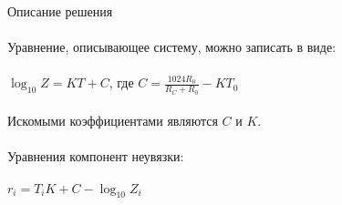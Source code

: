 \documentclass{article}
\begin{document}
    Описание решения\\\\
    Уравнение, описывающее систему, можно записать в виде:\\\\
    $\log_{10} Z = KT + C$, где $C = \frac{1024R_0}{R_C + R_0} - KT_0$\\\\
    Искомыми коэффициентами являются $C$ и $K$.\\\\
    Уравнения компонент неувязки:\\\\
    $r_i = T_{i}K + C - \log_{10}Z_i$\\\\
\end{document}
